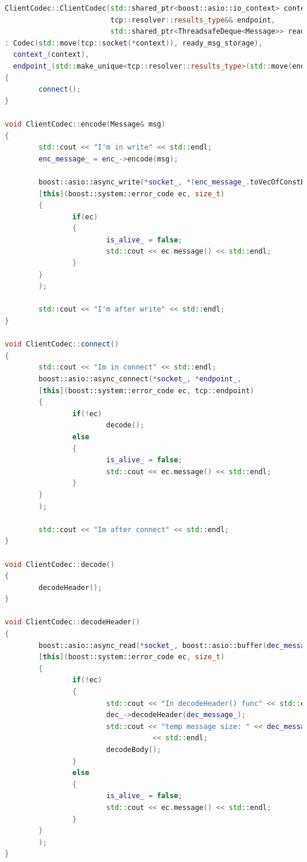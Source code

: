 \documentclass[a4paper, 14pt]{extreport}
\begin{document}
\begin{lstlisting}[language=C++, frame=single, xleftmargin=15pt, caption={Определение методов класса ClientCodec},label=DescriptiveLabel]
ClientCodec::ClientCodec(std::shared_ptr<boost::asio::io_context> context,
                         tcp::resolver::results_type&& endpoint,
                         std::shared_ptr<ThreadsafeDeque<Message>> ready_msg_storage)
: Codec(std::move(tcp::socket(*context)), ready_msg_storage),
  context_(context),
  endpoint_(std::make_unique<tcp::resolver::results_type>(std::move(endpoint)))
{
        connect();
}

void ClientCodec::encode(Message& msg)
{
        std::cout << "I'm in write" << std::endl;
        enc_message_ = enc_->encode(msg);

        boost::asio::async_write(*socket_, *(enc_message_.toVecOfConstBuf()),
        [this](boost::system::error_code ec, size_t)
        {
                if(ec)
                {
                        is_alive_ = false;
                        std::cout << ec.message() << std::endl;
                }
        }
        );

        std::cout << "I'm after write" << std::endl;
}

void ClientCodec::connect()
{
        std::cout << "Im in connect" << std::endl;
        boost::asio::async_connect(*socket_, *endpoint_,
        [this](boost::system::error_code ec, tcp::endpoint)
        {
                if(!ec)
                        decode();
                else
                {
                        is_alive_ = false;
                        std::cout << ec.message() << std::endl;
                }
        }
        );

        std::cout << "Im after connect" << std::endl;
}

void ClientCodec::decode()
{
        decodeHeader();
}

void ClientCodec::decodeHeader()
{
        boost::asio::async_read(*socket_, boost::asio::buffer(dec_message_.getHead(), SerializedMessage::HeaderLength),
        [this](boost::system::error_code ec, size_t)
        {
                if(!ec)
                {
                        std::cout << "In decodeHeader() func" << std::endl;
                        dec_->decodeHeader(dec_message_);
                        std::cout << "temp message size: " << dec_message_.getDataLength()
                                   << std::endl;
                        decodeBody();
                }
                else
                {
                        is_alive_ = false;
                        std::cout << ec.message() << std::endl;
                }
        }
        );
}


\end{lstlisting}
\end{document}
